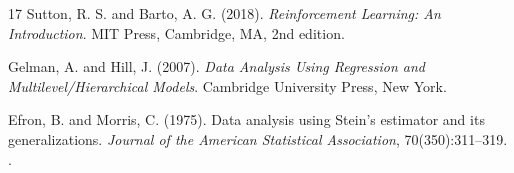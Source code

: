 \documentclass[11pt]{article}
\theoremstyle{plain}
\theoremstyle{definition}
\theoremstyle{remark}
\begin{document}
\begin{thebibliography}{17}
Sutton, R. S. and Barto, A. G. (2018).
\newblock \emph{Reinforcement Learning: An Introduction}.
\newblock MIT Press, Cambridge, MA, 2nd edition.

Gelman, A. and Hill, J. (2007).
\newblock \emph{Data Analysis Using Regression and Multilevel/Hierarchical Models}.
\newblock Cambridge University Press, New York.

Efron, B. and Morris, C. (1975).
\newblock Data analysis using Stein's estimator and its generalizations.
\newblock \emph{Journal of the American Statistical Association}, 70(350):311--319.
\newblock {}.

\end{thebibliography}
\end{document}
